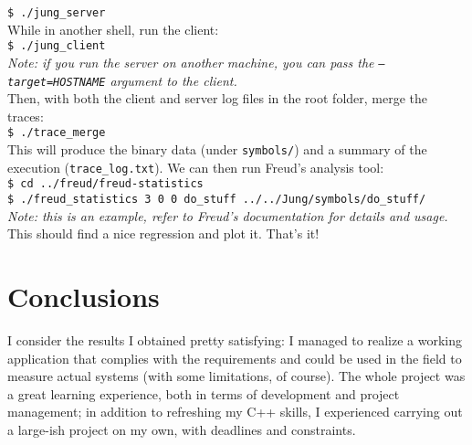         \texttt{\$ ./jung\_server}\\
        
        While in another shell, run the client:\\
        
        \texttt{\$ ./jung\_client}\\

        \textit{Note: if you run the server on another machine, you can pass the \texttt{---target=HOSTNAME}
        argument to the client.}\\

        Then, with both the client and server log files in the root folder, merge the traces:\\

        \texttt{\$ ./trace\_merge}\\

        This will produce the binary data (under \texttt{symbols/}) and a summary of the execution
        (\texttt{trace\_log.txt}).
        We can then run Freud's analysis tool:\\

        \texttt{\$ cd ../freud/freud-statistics}\\

        \texttt{\$ ./freud\_statistics 3 0 0 do\_stuff ../../Jung/symbols/do\_stuff/}\\
        
        \textit{Note: this is an example, refer to Freud's documentation for details and usage.}\\

        This should find a nice regression and plot it. That's it!


\chapter{Conclusions}


    I consider the results I obtained pretty satisfying: I managed to realize a working application
    that complies with the requirements and could be used in the field to measure actual systems
    (with some limitations, of course). The whole project was a great learning experience, both
    in terms of development and project management; in addition to refreshing my C++ skills, I
    experienced carrying out a large-ish project on my own, with deadlines and constraints.\\

